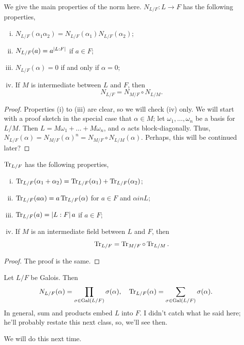 \begin{proposition} \label{prop:properties_of_norm}
    We give the main properties of the norm here. $N_{L/F} \colon L \to F$ has the following properties,
    \begin{enumerate}[(i)]
        \item $N_{L/F}(\alpha_1 \alpha_2) = N_{L/F}(\alpha_1) N_{L/F}(\alpha_2)$;
        \item $N_{L/F}(a) = a^{\left\lvert L:F \right\rvert}$ if $a \in F$;
        \item $N_{L/F}(\alpha) = 0$ if and only if $\alpha = 0$;
        \item If $M$ is intermediate between $L$ and $F$, then
        \[ N_{L/F} = N_{M/F} \circ N_{L/M}. \]
    \end{enumerate}
\end{proposition}
\begin{proof}
    Properties (i) to (iii) are clear, so we will check (iv) only. We will start with a proof sketch in the special case that $\alpha \in M$; let $\omega_1, \dots, \omega_n$ be a basis for $L/M$. Then $L = M \omega_1 + \dots + M \omega_n$, and $\alpha$ acts block-diagonally. Thus, $N_{L/F}(\alpha) = N_{M/F}(\alpha)^n = N_{M/F} \circ N_{L/M}(\alpha)$. {\color{airforceblue} Perhaps, this will be continued later?}
\end{proof}

\begin{proposition} \label{prop:properties_of_trace}
    $\operatorname{Tr}_{L/F}$ has the following properties,
    \begin{enumerate}[(i)]
        \item $\operatorname{Tr}_{L/F}(\alpha_1 + \alpha_2) = \operatorname{Tr}_{L/F}(\alpha_1) + \operatorname{Tr}_{L/F}(\alpha_2)$;
        \item $\operatorname{Tr}_{L/F}(a \alpha) = a \operatorname{Tr}_{L/F}(\alpha)$ for $a \in F$ and $\alpha in L$;
        \item $\operatorname{Tr}_{L/F}(a) = \left\lvert L : F \right\rvert a$ if $a \in F$;
        \item If $M$ is an intermediate field between $L$ and $F$, then
        \[ \operatorname{Tr}_{L/F} = \operatorname{Tr}_{M/F} \circ \operatorname{Tr}_{L/M}. \]
    \end{enumerate}
\end{proposition}
\begin{proof}
    The proof is the same.
\end{proof}

\begin{remark}
    Let $L/F$ be Galois. Then
    \[ N_{L/F}(\alpha) = \prod_{\sigma \in \operatorname{Gal}(L/F)} \sigma(\alpha), \quad \operatorname{Tr}_{L/F}(\alpha) = \sum_{\sigma \in \operatorname{Gal}(L/F)} \sigma(\alpha). \]
    In general, sum and products embed $L$ into $F$. {\color{airforceblue} I didn't catch what he said here; he'll probably restate this next class, so, we'll see then.}
\end{remark}
We will do this next time.
